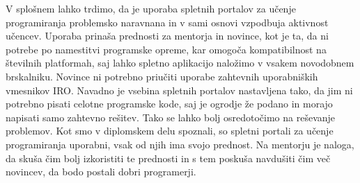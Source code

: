 V splošnem lahko trdimo, da je uporaba spletnih portalov za učenje
programiranja problemsko naravnana in v sami osnovi vzpodbuja
aktivnost učencev. Uporaba prinaša prednosti za mentorja in novince, kot
je ta, da ni potrebe po namestitvi programske opreme, kar omogoča
kompatibilnost na številnih platformah, saj lahko spletno aplikacijo
naložimo v vsakem novodobnem brskalniku. Novince ni potrebno priučiti
uporabe zahtevnih uporabniških vmesnikov IRO. Navadno je vsebina
spletnih portalov nastavljena tako, da jim ni potrebno pisati celotne
programske kode, saj je ogrodje že podano in morajo napisati samo
zahtevno rešitev. Tako se lahko bolj osredotočimo na reševanje
problemov. Kot smo v diplomskem delu spoznali, so spletni portali za
učenje programiranja uporabni, vsak od njih ima svojo prednost. Na
mentorju je naloga, da skuša čim bolj izkoristiti te prednosti in s
tem poskuša navdušiti čim več novincev, da bodo postali dobri
programerji.


